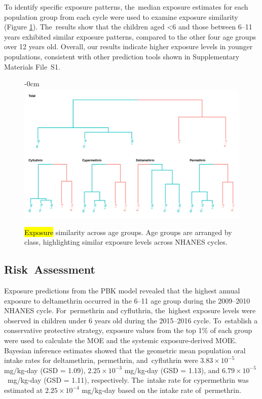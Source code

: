 \documentclass[toxics,article,accept,pdftex,moreauthors]{Definitions/mdpi}
\begin{document}
To identify specific exposure patterns, the~median exposure estimates
for each population group from each cycle were used to examine exposure
similarity (Figure \ref{fig:fig7}). The~results show that the children
aged \textless6 and those between 6--11 years exhibited similar exposure
patterns, compared to the other four age groups over 12 years old. Overall,
our results indicate higher exposure levels in younger populations,
consistent with other prediction tools shown in Supplementary Materials
File~S1.

\vspace{-3pt}\begin{figure}[H]
\begin{adjustwidth}{-\extralength}{0cm}
~~~~~~~~~~~~\includegraphics[width=0.879\linewidth]{figures/fig7_cluster}
\end{adjustwidth}
\caption{\hl{Exposure} %
 similarity across age groups. Age groups are arranged by
class, highlighting similar exposure levels across NHANES cycles.\label{fig:fig7}}
\end{figure}
\unskip

\subsection{Risk~Assessment}\label{risk-assessment}

Exposure predictions from the PBK model revealed that the highest annual
exposure to deltamethrin occurred in the 6--11 age group during the 2009--2010
NHANES cycle. For~permethrin and cyfluthrin, the~highest exposure levels were
observed in children under 6 years old during the 2015--2016 cycle. To~establish
a conservative protective strategy, exposure values from the top 1\% of each
group were used to calculate the MOE and the systemic exposure-derived MOIE.
Bayesian inference estimates showed that the geometric mean population oral
intake rates for deltamethrin, permethrin, and~cyfluthrin were \(3.83 \times
10^{-5}\) mg/kg-day (GSD = 1.09), \(2.25 \times 10^{-3}\) mg/kg-day (GSD =
1.13), and \mbox{\(6.79 \times 10^{-5}\) mg/kg-day} (GSD = 1.11), respectively. The~intake rate for cypermethrin was estimated at \(2.25 \times 10^{-4}\) mg/kg-day
based on the intake rate of~permethrin.
\end{document}
